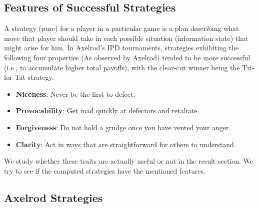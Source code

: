 \documentclass[a4paper]{article}
\begin{document}
	\subsection{Features of Successful Strategies}

A strategy (pure) for a player in a particular game is a plan describing what move that player should take in each possible situation (information state) that might arise for him.
In Axelrod’s IPD tournaments, strategies exhibiting the following four properties (As observed by Axelrod) tended to be more successful (i.e., to accumulate higher total payoffs), with the clear-cut winner being the Tit-for-Tat strategy.
	\begin{itemize}
		\item \textbf{Niceness}: Never be the first to defect.
		\item \textbf{Provocability}: Get mad quickly at defectors and retaliate.
		\item \textbf{Forgiveness}: Do not hold a grudge once you have vented your anger.
		\item \textbf{Clarity}: Act in ways that are straightforward for others to understand.
	\end{itemize}

	We study whether these traits are actually useful or not in the result section. We try to see  if the computed strategies have the mentioned features.
	
	\subsection{Axelrod Strategies}	
\end{document}
